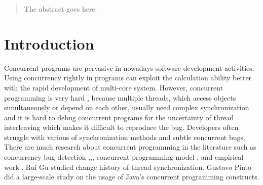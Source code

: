 \documentclass[conference]{IEEEtran}
\begin{document}




\maketitle

\begin{abstract}
The abstract goes here.
\end{abstract}





%
\IEEEpeerreviewmaketitle



\section{Introduction}
Concurrent programs are pervasive in nowadays software development activities. Using concurrency rightly in programs can exploit the calculation ability better with the rapid development of multi-core system. However, concurrent programming is very hard \cite{journals/corr/McKenney17},\cite{journals/queue/SutterL05} because multiple threads, which access objects simultaneously or depend on each other, usually need complex synchronization and it is hard to debug concurrent programs for the uncertainty of thread interleaving which makes it difficult to reproduce the bug. Developers often struggle with various of synchronization methods and subtle concurrent bugs. There are much research about concurrent programming in the literature such as concurrency bug detection \cite{conf/pldi/FlanaganF09},\cite{conf/kbse/KroeningPSW16},\cite{conf/pldi/FlanaganFY08}, concurrent programming model \cite{conf/java/Lea00},\cite{conf/oopsla/Bagherzadeh15} and empirical work \cite{conf/sosp/DavidGT13}. Rui Gu \cite{conf/sigsoft/GuJSZL15} studied change history of thread synchronization. Gustavo Pinto \cite{journals/jss/PintoTFFB15} did a large-scale study on the usage of Java’s concurrent programming constructs.
\end{document}
